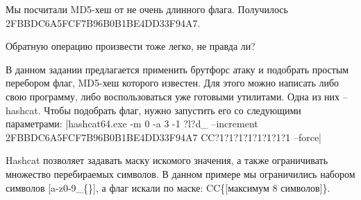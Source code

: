 
Мы посчитали MD5-хеш от не очень длинного флага. Получилось 2FBBDC6A5FCF7B96B0B1BE4DD33F94A7.

Обратную операцию произвести тоже легко, не правда ли?

\solutionSection

В данном задании предлагается применить брутфорс атаку и подобрать простым перебором флаг, MD5-хеш которого известен. Для этого можно написать либо свою программу, либо воспользоваться уже готовыми утилитами. Одна из них – hashcat. Чтобы подобрать флаг, нужно запустить его со следующими параметрами:
|hashcat64.exe -m 0 -a 3 -1 ?l?d_{} --increment 2FBBDC6A5FCF7B96B0B1BE4DD33F94A7 CC{?1?1?1?1?1?1?1?1} --force|

Hashcat позволяет задавать маску искомого значения, а также ограничивать множество перебираемых символов. В данном примере мы ограничились набором символов [a-z0-9\_\{\}], а флаг искали по маске: CC\{[максимум 8 символов]\}.

